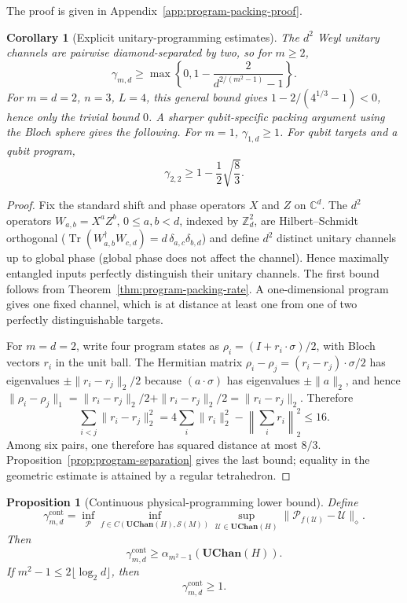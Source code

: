 \documentclass[11pt,a4paper]{article}
\theoremstyle{definition}
\theoremstyle{plain}
\newtheorem{proposition}[theorem]{Proposition}
\newtheorem{corollary}[theorem]{Corollary}
\theoremstyle{remark}
\DeclareMathOperator{\Tr}{Tr}
\newcommand{\UChan}{\mathbf{UChan}}
\newcommand{\Sstate}{\mathcal{S}}
\begin{document}
The proof is given in Appendix~\ref{app:program-packing-proof}.

\begin{corollary}[Explicit unitary-programming estimates]
\label{cor:explicit-programming}
The $d^2$ Weyl unitary channels are pairwise diamond-separated by two, so
for $m\geq2$,
\[
\gamma_{m,d}
\geq
\max\left\{0,
1-\frac2{d^{2/(m^2-1)}-1}
\right\}.
\]
For $m=d=2$, $n=3$, $L=4$, this general bound gives $1-2/(4^{1/3}-1)<0$, hence only the trivial bound $0$. A sharper qubit-specific packing argument using the Bloch sphere gives the following. For $m=1$, $\gamma_{1,d}\geq1$. For qubit targets and a qubit program,
\[
\gamma_{2,2}
\geq1-\frac12\sqrt{\frac83}.
\]
\end{corollary}

\begin{proof}
Fix the standard shift and phase operators $X$ and $Z$ on
$\mathbb C^d$. The $d^2$ operators $W_{a,b}=X^aZ^b$,
$0\leq a,b<d$, indexed by $\mathbb Z_d^2$, are Hilbert--Schmidt orthogonal ($\Tr(W_{a,b}^\dagger W_{c,d})=d\,\delta_{a,c}\delta_{b,d}$) and define $d^2$ distinct unitary channels up to global phase (global phase does not affect the channel). Hence maximally entangled
inputs perfectly distinguish their unitary channels. The first bound follows from
Theorem~\ref{thm:program-packing-rate}. A one-dimensional program gives one
fixed channel, which is at distance at least one from one of two perfectly
distinguishable targets.

For $m=d=2$, write four program states as
$\rho_i=(I+r_i\cdot\sigma)/2$, with Bloch vectors $r_i$ in the unit ball.
The Hermitian matrix
$\rho_i-\rho_j=(r_i-r_j)\cdot\sigma/2$ has eigenvalues
$\pm\|r_i-r_j\|_2/2$ because $(a\cdot\sigma)$ has eigenvalues $\pm\|a\|_2$, and hence
$\|\rho_i-\rho_j\|_1=\|r_i-r_j\|_2/2+\|r_i-r_j\|_2/2=\|r_i-r_j\|_2$. Therefore
\[
\sum_{i<j}\|r_i-r_j\|_2^2
=4\sum_i\|r_i\|_2^2-
 \left\|\sum_i r_i\right\|_2^2
\leq16.
\]
Among six pairs, one therefore has squared distance at most $8/3$.
Proposition~\ref{prop:program-separation} gives the last bound; equality in
the geometric estimate is attained by a regular tetrahedron.
\end{proof}

\begin{proposition}[Continuous physical-programming lower bound]
\label{prop:continuous-programming-floor}
Define
\[
\gamma^{\mathrm{cont}}_{m,d}
=
\inf_{\mathcal P}
\inf_{f\in C(\UChan(H),\Sstate(M))}
\sup_{\mathcal U\in\UChan(H)}
\|\mathcal P_{f(\mathcal U)}-\mathcal U\|_\diamond.
\]
Then
\[
\gamma^{\mathrm{cont}}_{m,d}
\geq\alpha_{m^2-1}(\UChan(H)).
\]
If $m^2-1\leq2\lfloor\log_2d\rfloor$, then
\[
\gamma^{\mathrm{cont}}_{m,d}\geq1.
\]
\end{proposition}
\end{document}
